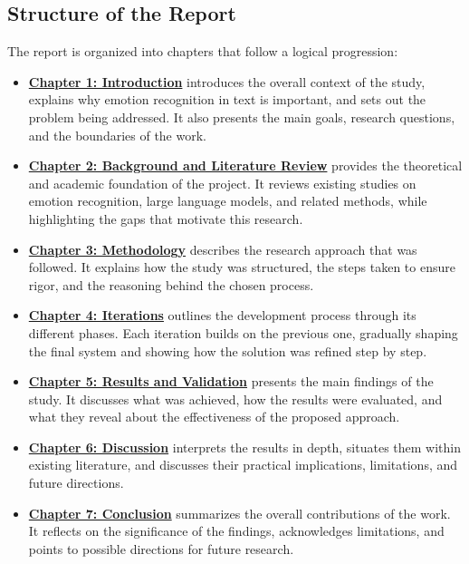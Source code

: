 \subsection{Structure of the Report}
The report is organized into chapters that follow a logical progression:
\begin{itemize}
    \item \hyperref[chap:intro]{\textbf{Chapter 1: Introduction}}   introduces the overall context of the study, explains why emotion recognition in text is important, and sets out the problem being addressed. It also presents the main goals, research questions, and the boundaries of the work.  
    
    \item \hyperref[chap:background]{\textbf{Chapter 2: Background and Literature Review}}   provides the theoretical and academic foundation of the project. It reviews existing studies on emotion recognition, large language models, and related methods, while highlighting the gaps that motivate this research.  
    
    \item \hyperref[chap:methodology]{\textbf{Chapter 3: Methodology}}   describes the research approach that was followed. It explains how the study was structured, the steps taken to ensure rigor, and the reasoning behind the chosen process.  
    
    \item \hyperref[chap:Iterations]{\textbf{Chapter 4: Iterations}}   outlines the development process through its different phases. Each iteration builds on the previous one, gradually shaping the final system and showing how the solution was refined step by step.  
    
    \item \hyperref[chap:results]{\textbf{Chapter 5: Results and Validation}}   presents the main findings of the study. It discusses what was achieved, how the results were evaluated, and what they reveal about the effectiveness of the proposed approach.

    \item \hyperref[chap:discussion]{\textbf{Chapter 6: Discussion}}   interprets the results in depth, situates them within existing literature, and discusses their practical implications, limitations, and future directions.

    \item \hyperref[chap:conclusion]{\textbf{Chapter 7: Conclusion}}   summarizes the overall contributions of the work. It reflects on the significance of the findings, acknowledges limitations, and points to possible directions for future research.
\end{itemize}   
